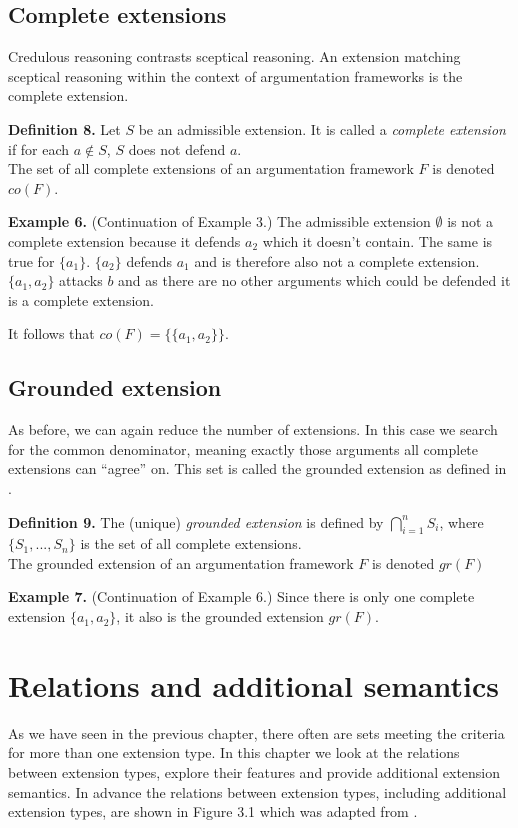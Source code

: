 \documentclass[draft,final]{vutinfth} %
\newcommand{\hl}{\par\vspace{6pt}} %
\newcommand{\cl}{\par\vspace{12pt}} %
\begin{document}
\section{Complete extensions}

Credulous reasoning contrasts sceptical reasoning. An extension matching sceptical reasoning within the context of argumentation frameworks is the complete extension.\cl

\textbf{Definition 8.} Let $S$ be an admissible extension. It is called a \emph{complete extension} if for each $a\not\in S$, $S$ does not defend $a$.\\
The set of all complete extensions of an argumentation framework $F$ is denoted $co(F)$.\cl

\textbf{Example 6.} (Continuation of Example 3.) The admissible extension $\emptyset$ is not a complete extension because it defends $a_2$ which it doesn't contain. The same is true for $\{a_1\}$. $\{a_2\}$ defends $a_1$ and is therefore also not a complete extension.\\
$\{a_1,a_2\}$ attacks $b$ and as there are no other arguments which could be defended it is a complete extension.\hl
It follows that $co(F)=\{\{a_1,a_2\}\}$.\cl

\section{Grounded extension}

As before, we can again reduce the number of extensions. In this case we search for the common denominator, meaning exactly those arguments all complete extensions can ``agree'' on. This set is called the grounded extension as defined in \cite{Egly}.\cl

\textbf{Definition 9.} The (unique) \emph{grounded extension} is defined by $\bigcap\limits_{i=1}^n{S_i}$, where $\{S_1,...,S_n\}$ is the set of all complete extensions.\\
The grounded extension of an argumentation framework $F$ is denoted $gr(F)$\cl

\textbf{Example 7.} (Continuation of Example 6.) Since there is only one complete extension $\{a_1,a_2\}$, it also is the grounded extension $gr(F)$.\cl

\chapter{Relations and additional semantics}

As we have seen in the previous chapter, there often are sets meeting the criteria for more than one extension type. In this chapter we look at the relations between extension types, explore their features and provide additional extension semantics. In advance the relations between extension types, including additional extension types, are shown in Figure 3.1 which was adapted from \cite{Gorogiannis}.\cl
\end{document}
